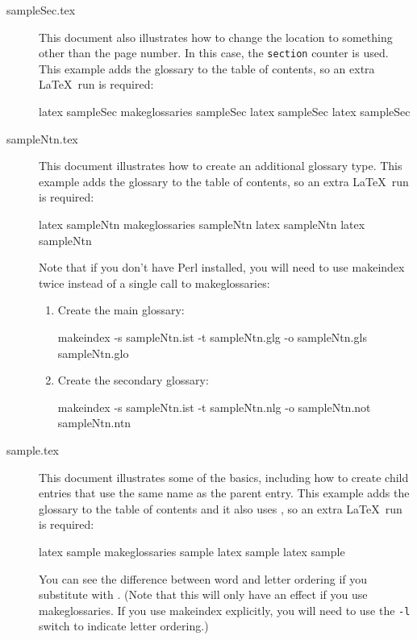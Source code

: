 \documentclass[report]{nlctdoc}
\begin{document}
\begin{description}
\item[sampleSec.tex]\label{ex:sampleSec} This document also
illustrates how to change the location to something other than the
page number. In this case, the \texttt{section} counter is used.
This example adds the glossary to the table of contents, so an extra
\LaTeX\ run is required:
\begin{prompt}
latex sampleSec
makeglossaries sampleSec
latex sampleSec
latex sampleSec
\end{prompt}

\item[sampleNtn.tex]\label{ex:sampleNtn} This document illustrates
how to create an additional glossary type. This example adds the
glossary to the table of contents, so an extra \LaTeX\ run is
required:
\begin{prompt}
latex sampleNtn
makeglossaries sampleNtn
latex sampleNtn
latex sampleNtn
\end{prompt}
Note that if you don't have Perl installed, you will need to use
\gls{makeindex} twice instead of a single call to
\gls{makeglossaries}:
\begin{enumerate}
\item Create the main glossary:
\begin{prompt}
makeindex -s sampleNtn.ist -t sampleNtn.glg -o sampleNtn.gls sampleNtn.glo
\end{prompt}
\item Create the secondary glossary:
\begin{prompt}
makeindex -s sampleNtn.ist -t sampleNtn.nlg -o sampleNtn.not sampleNtn.ntn
\end{prompt}
\end{enumerate}

\item[sample.tex]\label{ex:sample} This document illustrates some of
the basics, including how to create child entries that use the same
name as the parent entry. This example adds the glossary to the
table of contents and it also uses , so an extra \LaTeX\ 
run is required:
\begin{prompt}
latex sample
makeglossaries sample
latex sample
latex sample
\end{prompt}
You can see the difference between word and letter ordering if you
substitute \pkgopt[word]{order} with \pkgopt[letter]{order}. (Note
that this will only have an effect if you use
\gls{makeglossaries}. If you use \gls{makeindex} explicitly,
you will need to use the \texttt{-l} switch to indicate letter
ordering.)


\end{description}
\end{document}
